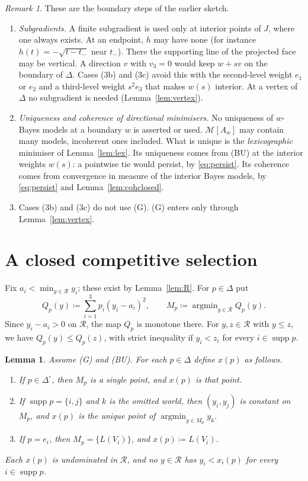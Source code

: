 \documentclass[11pt]{article}
\newtheorem{lemma}[theorem]{Lemma}
\theoremstyle{remark}
\newtheorem{remark}[theorem]{Remark}
\newcommand{\Di}{\Delta^{\circ}}
\newcommand{\M}{\mathcal M}
\newcommand{\Rr}{\mathcal R}
\newcommand{\supp}{\operatorname{supp}}
\DeclareMathOperator*{\argmin}{argmin}
\begin{document}
\begin{remark}\label{rem:boundary}
These are the boundary steps of the earlier sketch.
\begin{enumerate}[leftmargin=*,label=(\roman*)]
\item \emph{Subgradients.} A finite subgradient is used only at interior points of $J$, where one always exists. At an endpoint, $h$ may have none (for instance $h(t)=-\sqrt{t-t_-}$ near $t_-$). There the supporting line of the projected face may be vertical. A direction $v$ with $v_3=0$ would keep $w+sv$ on the boundary of $\Delta$. Cases (3b) and (3c) avoid this with the second-level weight $e_1$ or $e_2$ and a third-level weight $s^2e_3$ that makes $w(s)$ interior. At a vertex of $\Delta$ no subgradient is needed (Lemma~\ref{lem:vertex}).
\item \emph{Uniqueness and coherence of directional minimisers.} No uniqueness of $w$-Bayes models at a boundary $w$ is asserted or used. $\M[A_w]$ may contain many models, incoherent ones included. What is unique is the \emph{lexicographic} minimiser of Lemma~\ref{lem:lex}. Its uniqueness comes from (BU) at the interior weights $w(s)$: a pointwise tie would persist, by \eqref{eq:persist}. Its coherence comes from convergence in measure of the interior Bayes models, by \eqref{eq:persist} and Lemma~\ref{lem:cohclosed}.
\item Cases (3b) and (3c) do not use (G). (G) enters only through Lemma~\ref{lem:vertex}.
\end{enumerate}
\end{remark}

\section{A closed competitive selection}\label{sec:selection}

Fix $a_i<\min_{y\in\Rr}y_i$; these exist by Lemma~\ref{lem:R}. For $p\in\Delta$ put
\[
Q_p(y)\coloneqq\sum_{i=1}^3p_i(y_i-a_i)^2,\qquad M_p\coloneqq\argmin_{y\in\Rr}Q_p(y).
\]
Since $y_i-a_i>0$ on $\Rr$, the map $Q_p$ is monotone there. For $y,z\in\Rr$ with $y\le z$, we have $Q_p(y)\le Q_p(z)$, with strict inequality if $y_i<z_i$ for every $i\in\supp p$.

\begin{lemma}\label{lem:select}
Assume \textup{(G)} and \textup{(BU)}. For each $p\in\Delta$ define $x(p)$ as follows.
\begin{enumerate}[leftmargin=*,label=\textup{(\roman*)}]
\item If $p\in\Di$, then $M_p$ is a single point, and $x(p)$ is that point.
\item If $\supp p=\{i,j\}$ and $k$ is the omitted world, then $(y_i,y_j)$ is constant on $M_p$, and $x(p)$ is the unique point of $\argmin_{y\in M_p}y_k$.
\item If $p=e_i$, then $M_p=\{L(V_i)\}$, and $x(p)\coloneqq L(V_i)$.
\end{enumerate}
Each $x(p)$ is undominated in $\Rr$, and no $y\in\Rr$ has $y_i<x_i(p)$ for every $i\in\supp p$.
\end{lemma}
\end{document}
